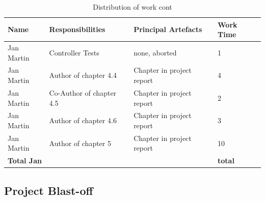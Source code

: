     \begin{table}[!h]
  \caption{Distribution of work cont}
  \centering
  \begin{tabular}{p{2cm}||p{4.2cm}|p{4cm}|l|}
  Name & Responsibilities & Principal Artefacts & Work Time\\
    \hline
  	\hline  
    Jan Martin & Controller Tests & none, aborted & 1 \\ 
    \hline  
    Jan Martin & Author of chapter 4.4 & Chapter in project report & 4 \\ 
    \hline
    Jan Martin & Co-Author of chapter 4.5 & Chapter in project report & 2 \\
    \hline 
    Jan Martin & Author of chapter 4.6 & Chapter in project report & 3 \\ 
    \hline
    Jan Martin & Author of chapter 5 & Chapter in project report & 10 \\ 
    \hline
    \hline 
    \textbf{Total \newline Jan} & & & \textbf{total}   \\
    \hline
    \hline
  \end{tabular}
\end{table}

\subsection{Project Blast-off}

